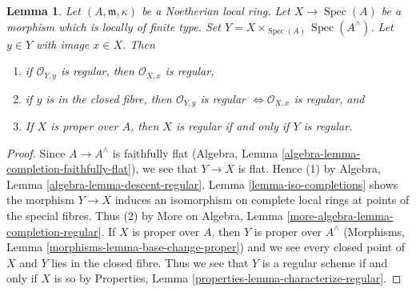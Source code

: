 \documentclass[10pt,a4paper]{amsart}
\theoremstyle{plain}
\newtheorem{lemma}[subsection]{Lemma}
\theoremstyle{definition}
\theoremstyle{remark}
\numberwithin{equation}{subsection}
\def\Spec{\mathop{\mathrm{Spec}}}
\begin{document}
\begin{lemma}
\label{lemma-port-regularity-to-completion}
Let $(A, \mathfrak m, \kappa)$ be a Noetherian local ring.
Let $X \to \Spec(A)$ be a morphism which is locally of finite type.
Set $Y = X \times_{\Spec(A)} \Spec(A^\wedge)$. Let $y \in Y$ with
image $x \in X$. Then
\begin{enumerate}
\item if $\mathcal{O}_{Y, y}$ is regular, then $\mathcal{O}_{X, x}$
is regular,
\item if $y$ is in the closed fibre, then $\mathcal{O}_{Y, y}$ is regular
$\Leftrightarrow \mathcal{O}_{X, x}$ is regular, and
\item If $X$ is proper over $A$, then $X$ is regular
if and only if $Y$ is regular.
\end{enumerate}
\end{lemma}

\begin{proof}
Since $A \to A^\wedge$ is faithfully flat
(Algebra, Lemma \ref{algebra-lemma-completion-faithfully-flat}),
we see that $Y \to X$ is flat. Hence (1) by
Algebra, Lemma \ref{algebra-lemma-descent-regular}.
Lemma \ref{lemma-iso-completions} shows the morphism $Y \to X$
induces an isomorphism on complete local rings at points
of the special fibres. Thus (2) by
More on Algebra, Lemma \ref{more-algebra-lemma-completion-regular}.
If $X$ is proper over $A$, then $Y$ is proper over $A^\wedge$
(Morphisms, Lemma \ref{morphisms-lemma-base-change-proper})
and we see every closed point of $X$ and $Y$ lies in the closed fibre.
Thus we see that $Y$ is a regular scheme if and only if $X$ is so by
Properties, Lemma \ref{properties-lemma-characterize-regular}.
\end{proof}
\end{document}
